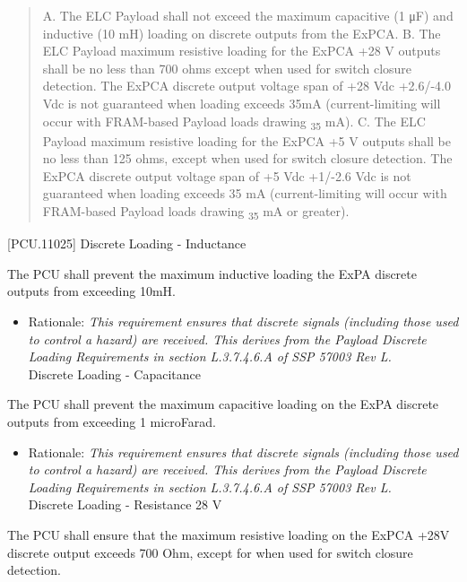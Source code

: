 \begin{quote}
A. The ELC Payload shall not exceed the maximum capacitive (1 μF) and inductive (10 mH) loading on discrete outputs from the ExPCA.
B. The ELC Payload maximum resistive loading for the ExPCA +28 V outputs shall be no less than 700 ohms except when used for switch closure detection. The ExPCA discrete output voltage span of +28 Vdc +2.6\slash -4.0 Vdc is not guaranteed when loading exceeds 35mA (current-limiting will occur with FRAM-based Payload loads drawing \textsubscript{35} mA).
C. The ELC Payload maximum resistive loading for the ExPCA +5 V outputs shall be no less than 125 ohms, except when used for switch closure detection. The ExPCA discrete output voltage span of +5 Vdc +1\slash -2.6 Vdc is not guaranteed when loading exceeds 35 mA (current-limiting will occur with FRAM-based Payload loads drawing \textsubscript{35} mA or greater).
\end{quote}

[PCU.11025] Discrete Loading - Inductance

The PCU shall prevent the maximum inductive loading the ExPA discrete outputs from exceeding 10mH.

\begin{itemize}
\item{} Rationale: \emph{This requirement ensures that discrete signals (including those used to control a hazard) are received. This derives from the Payload Discrete Loading Requirements in section L.3.7.4.6.A of SSP 57003 Rev L.}\\
[PCU.11020] Discrete Loading - Capacitance

\end{itemize}

The PCU shall prevent the maximum capacitive loading on the ExPA discrete outputs from exceeding 1 microFarad.

\begin{itemize}
\item{} Rationale: \emph{This requirement ensures that discrete signals (including those used to control a hazard) are received. This derives from the Payload Discrete Loading Requirements in section L.3.7.4.6.A of SSP 57003 Rev L.}\\
[PCU.11031] Discrete Loading - Resistance 28 V

\end{itemize}

The PCU shall ensure that the maximum resistive loading on the ExPCA +28V discrete output exceeds 700 Ohm, except for when used for switch closure detection.

